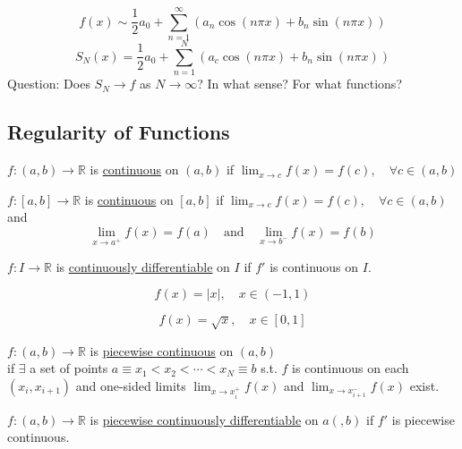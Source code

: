 

\[f(x) \sim \frac{1}{2}a_0 + \sum_{n=1}^{\infty}(a_n \cos(n\pi x) + b_n \sin(n\pi x))\]
\[S_N (x) = \frac{1}{2}a_0 + \sum_{n=1}^{N} (a_c \cos (n\pi x) + b_n \sin (n\pi x))\]
Question: Does $S_N \to f$ as $N \to \infty$? In what sense? For what functions?

\subsection{Regularity of Functions}
\begin{definition}
    $f:(a, b) \to \mathbb{R} $ is \underline{continuous} on $(a,b)$ if $\lim_{x \to c}f(x) = f(c), \quad \forall c \in (a,b)$
\end{definition}
\begin{definition}
    $f:[a,b] \to \mathbb{R}$ is \underline{continuous} on $[a,b]$ if $\lim_{x \to c}f(x) = f(c), \quad \forall c \in (a,b)$ and
    \[\lim_{x \to a^+}f(x) = f(a) \quad \text{and}  \quad \lim_{x \to b^-}f(x) = f(b)  \]
\end{definition}
\begin{definition}
    $f:I\to \mathbb{R}$ is \underline{continuously differentiable} on $I$ if $f'$ is continuous on $I$.
\end{definition}

\begin{example}
    \[f(x) = \left\lvert x\right\rvert , \quad x\in (-1,1)\]
\end{example}
\begin{example}
    \[f(x) = \sqrt{x}, \quad x\in [0,1]\]



\end{example}

\begin{definition}
    $f:(a, b) \to \mathbb{R}$ is \underline{piecewise continuous} on $(a, b)$ 
    \\if $\exists$ a set of points $a \equiv x_1 < x_2 < \cdots < x_N \equiv b$ s.t. $f$ is continuous on each $(x_i, x_{i+1}) $ and one-sided limits $\lim_{x \to x_i^+}f(x)$ and $\lim_{x\to x_{i+1}^-}f(x)$ exist.
\end{definition}

\begin{definition}
    $f:(a,b) \to \mathbb{R}$ is \underline{piecewise continuously differentiable} on $a(,b)$ if $f'$ is piecewise continuous.
\end{definition}

